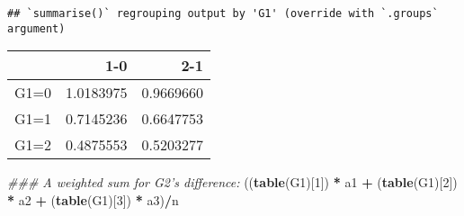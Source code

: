 \documentclass[]{article}
\newenvironment{Shaded}{\begin{snugshade}}{\end{snugshade}}
\newcommand{\CommentTok}[1]{\textcolor[rgb]{0.56,0.35,0.01}{\textit{#1}}}
\newcommand{\DecValTok}[1]{\textcolor[rgb]{0.00,0.00,0.81}{#1}}
\newcommand{\KeywordTok}[1]{\textcolor[rgb]{0.13,0.29,0.53}{\textbf{#1}}}
\newcommand{\NormalTok}[1]{#1}
\newcommand{\OperatorTok}[1]{\textcolor[rgb]{0.81,0.36,0.00}{\textbf{#1}}}
\newcommand{\StringTok}[1]{\textcolor[rgb]{0.31,0.60,0.02}{#1}}
\begin{document}
\begin{verbatim}
## `summarise()` regrouping output by 'G1' (override with `.groups` argument)
\end{verbatim}

\begin{Shaded}
\end{Shaded}

\begin{longtable}[]{@{}lrr@{}}
\toprule
& 1-0 & 2-1\tabularnewline
\midrule
\endhead
G1=0 & 1.0183975 & 0.9669660\tabularnewline
G1=1 & 0.7145236 & 0.6647753\tabularnewline
G1=2 & 0.4875553 & 0.5203277\tabularnewline
\bottomrule
\end{longtable}

\begin{Shaded}
\begin{Highlighting}[]
\CommentTok{### A weighted sum for G2's difference:}
\NormalTok{((}\KeywordTok{table}\NormalTok{(G1)[}\DecValTok{1}\NormalTok{]) }\OperatorTok{*}\StringTok{ }\NormalTok{a1 }\OperatorTok{+}\StringTok{ }\NormalTok{(}\KeywordTok{table}\NormalTok{(G1)[}\DecValTok{2}\NormalTok{]) }\OperatorTok{*}\StringTok{ }\NormalTok{a2 }\OperatorTok{+}\StringTok{ }\NormalTok{(}\KeywordTok{table}\NormalTok{(G1)[}\DecValTok{3}\NormalTok{]) }\OperatorTok{*}\StringTok{ }\NormalTok{a3)}\OperatorTok{/}\NormalTok{n}
\end{Highlighting}
\end{Shaded}
\end{document}
